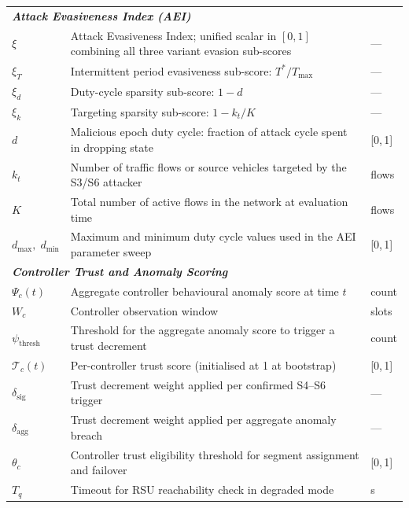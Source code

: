 \documentclass[12pt, a4paper]{report}
\begin{document}
\begin{longtable}{p{2.6cm} p{9.2cm} p{1.9cm}}
\multicolumn{3}{l}{\textit{\textbf{Attack Evasiveness Index (AEI)}}} \\[2pt]
$\xi$ & Attack Evasiveness Index; unified scalar in $[0,1]$ combining all three variant evasion sub-scores & --- \\
$\xi_T$ & Intermittent period evasiveness sub-score: $T^*/T_{\max}$ & --- \\
$\xi_d$ & Duty-cycle sparsity sub-score: $1 - d$ & --- \\
$\xi_k$ & Targeting sparsity sub-score: $1 - k_t/K$ & --- \\
$d$ & Malicious epoch duty cycle: fraction of attack cycle spent in dropping state & [0,\,1] \\
$k_t$ & Number of traffic flows or source vehicles targeted by the S3/S6 attacker & flows \\
$K$ & Total number of active flows in the network at evaluation time & flows \\
$d_{\max},\; d_{\min}$ & Maximum and minimum duty cycle values used in the AEI parameter sweep & [0,\,1] \\[6pt]

\multicolumn{3}{l}{\textit{\textbf{Controller Trust and Anomaly Scoring}}} \\[2pt]
$\Psi_c(t)$ & Aggregate controller behavioural anomaly score at time $t$ & count \\
$W_c$ & Controller observation window & slots \\
$\psi_\mathrm{thresh}$ & Threshold for the aggregate anomaly score to trigger a trust decrement & count \\
$\mathcal{T}_c(t)$ & Per-controller trust score (initialised at 1 at bootstrap) & [0,\,1] \\
$\delta_\mathrm{sig}$ & Trust decrement weight applied per confirmed S4--S6 trigger & --- \\
$\delta_\mathrm{agg}$ & Trust decrement weight applied per aggregate anomaly breach & --- \\
$\theta_c$ & Controller trust eligibility threshold for segment assignment and failover & [0,\,1] \\
$T_q$ & Timeout for RSU reachability check in degraded mode & s \\[6pt]


\end{longtable}
\end{document}
